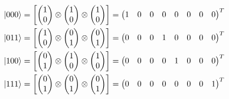 \begin{equation}\label{eq:3qubit}
	\begin{split}
\ket{000} &= \left[ \begin{pmatrix}
1 \\
0
\end{pmatrix} \otimes \begin{pmatrix}
1 \\
0
\end{pmatrix} \otimes \begin{pmatrix}
1 \\
0
\end{pmatrix}\right] = \begin{pmatrix}
1 & 0 & 0 & 0 & 0 & 0 & 0 & 0
\end{pmatrix}^T \\
\ket{011} &= \left[ \begin{pmatrix}
1 \\
0
\end{pmatrix} \otimes \begin{pmatrix}
0 \\
1
\end{pmatrix} \otimes \begin{pmatrix}
0 \\
1
\end{pmatrix}\right] = \begin{pmatrix}
0 & 0 & 0 & 1 & 0 & 0 & 0 & 0
\end{pmatrix}^T \\
\ket{100} &= \left[ \begin{pmatrix}
0 \\
1
\end{pmatrix} \otimes \begin{pmatrix}
1 \\
0
\end{pmatrix} \otimes \begin{pmatrix}
1 \\
0
\end{pmatrix}\right] = \begin{pmatrix}
0 & 0 & 0 & 0 & 1 & 0 & 0 & 0
\end{pmatrix}^T \\
\ket{111} &=\left[ \begin{pmatrix}
0 \\
1
\end{pmatrix} \otimes \begin{pmatrix}
0 \\
1
\end{pmatrix} \otimes \begin{pmatrix}
0 \\
1
\end{pmatrix}\right] = \begin{pmatrix}
0 & 0 & 0 & 0 & 0 & 0 & 0 & 1
\end{pmatrix}^T
	\end{split}
\end{equation}

